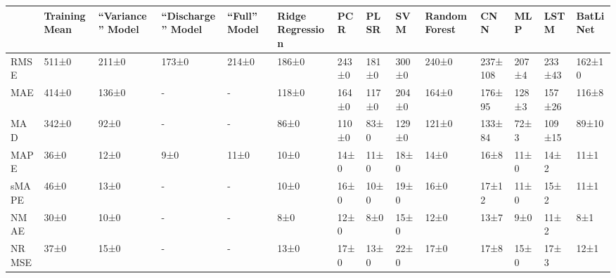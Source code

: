 \begin{tabular}{llllllllllllll}
\toprule
 & Training Mean & ``Variance'' Model & ``Discharge'' Model & ``Full'' Model & Ridge Regression & PCR & PLSR & SVM & Random Forest & CNN & MLP & LSTM & BatLiNet \\
\midrule
RMSE & 511±0 & 211±0 & 173±0 & 214±0 & 186±0 & 243±0 & 181±0 & 300±0 & 240±0 & 237±108 & 207±4 & 233±43 & 162±10 \\
MAE & 414±0 & 136±0 & - & - & 118±0 & 164±0 & 117±0 & 204±0 & 164±0 & 176±95 & 128±3 & 157±26 & 116±8 \\
MAD & 342±0 & 92±0 & - & - & 86±0 & 110±0 & 83±0 & 129±0 & 121±0 & 133±84 & 72±3 & 109±15 & 89±10 \\
MAPE & 36±0 & 12±0 & 9±0 & 11±0 & 10±0 & 14±0 & 11±0 & 18±0 & 14±0 & 16±8 & 11±0 & 14±2 & 11±1 \\
sMAPE & 46±0 & 13±0 & - & - & 10±0 & 16±0 & 10±0 & 19±0 & 16±0 & 17±12 & 11±0 & 15±2 & 11±1 \\
NMAE & 30±0 & 10±0 & - & - & 8±0 & 12±0 & 8±0 & 15±0 & 12±0 & 13±7 & 9±0 & 11±2 & 8±1 \\
NRMSE & 37±0 & 15±0 & - & - & 13±0 & 17±0 & 13±0 & 22±0 & 17±0 & 17±8 & 15±0 & 17±3 & 12±1 \\
\bottomrule
\end{tabular}
